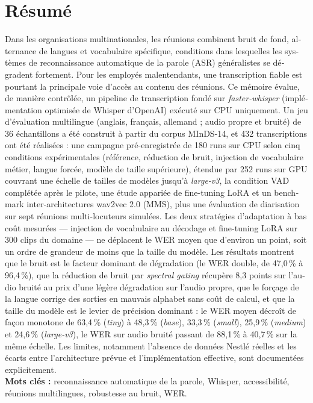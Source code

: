 \documentclass[12pt]{report}
\begin{document}
\newpage
\section*{Résumé}
\begin{otherlanguage}{french}
Dans les organisations multinationales, les réunions combinent bruit de fond, alternance de langues et vocabulaire spécifique, conditions dans lesquelles les systèmes de reconnaissance automatique de la parole (ASR) généralistes se dégradent fortement. Pour les employés malentendants, une transcription fiable est pourtant la principale voie d'accès au contenu des réunions. Ce mémoire évalue, de manière contrôlée, un pipeline de transcription fondé sur \textit{faster-whisper} (implémentation optimisée de Whisper d'OpenAI) exécuté sur CPU uniquement. Un jeu d'évaluation multilingue (anglais, français, allemand ; audio propre et bruité) de 36 échantillons a été construit à partir du corpus MInDS-14, et 432 transcriptions ont été réalisées : une campagne pré-enregistrée de 180 runs sur CPU selon cinq conditions expérimentales (référence, réduction de bruit, injection de vocabulaire métier, langue forcée, modèle de taille supérieure), étendue par 252 runs sur GPU couvrant une échelle de tailles de modèles jusqu'à \textit{large-v3}, la condition VAD complétée après le pilote, une étude appariée de fine-tuning LoRA et un benchmark inter-architectures wav2vec 2.0 (MMS), plus une évaluation de diarisation sur sept réunions multi-locuteurs simulées. Les deux stratégies d'adaptation à bas coût mesurées --- injection de vocabulaire au décodage et fine-tuning LoRA sur 300 clips du domaine --- ne déplacent le WER moyen que d'environ un point, soit un ordre de grandeur de moins que la taille du modèle. Les résultats montrent que le bruit est le facteur dominant de dégradation (le WER double, de 47{,}0\,\% à 96{,}4\,\%), que la réduction de bruit par \textit{spectral gating} récupère 8{,}3 points sur l'audio bruité au prix d'une légère dégradation sur l'audio propre, que le forçage de la langue corrige des sorties en mauvais alphabet sans coût de calcul, et que la taille du modèle est le levier de précision dominant : le WER moyen décroît de façon monotone de 63{,}4\,\% (\textit{tiny}) à 48{,}3\,\% (\textit{base}), 33{,}3\,\% (\textit{small}), 25{,}9\,\% (\textit{medium}) et 24{,}6\,\% (\textit{large-v3}), le WER sur audio bruité passant de 88{,}1\,\% à 40{,}7\,\% sur la même échelle. Les limites, notamment l'absence de données Nestlé réelles et les écarts entre l'architecture prévue et l'implémentation effective, sont documentées explicitement.
\\
\textbf{Mots clés :} reconnaissance automatique de la parole, Whisper, accessibilité, réunions multilingues, robustesse au bruit, WER.
\end{otherlanguage}
\thispagestyle{fancy}
\newpage
\end{document}

